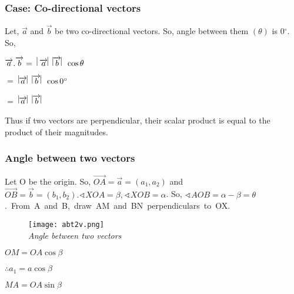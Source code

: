\documentclass[11pt]{article}
\begin{document}
\subsubsection{Case: Co-directional vectors}
Let, $\overrightarrow{a}$ and $\overrightarrow{b}$ be two co-directional vectors. So, angle between them $(\theta)$ is 0$^{\circ}$.\\
So, \begin{center} $\overrightarrow{a}.\overrightarrow{b} =\hspace{0.2cm} \vline \overrightarrow{a} \vline \hspace{0.2cm} \vline \overrightarrow{b} \vline \hspace{0.2cm} \cos \theta$


\hspace{0.9cm}
$=$ $\vline \overrightarrow{a} \vline \hspace{0.2cm} \vline \overrightarrow{b} \vline \hspace{0.2cm} \cos 0^{\circ}$


\hspace{-0.2cm}
$=$ $\vline \overrightarrow{a} \vline \hspace{0.2cm} \vline \overrightarrow{b} \vline$
\end{center}
Thus if two vectors are perpendicular, their scalar product is equal to the product of their magnitudes.
\newpage
\subsubsection{Angle between two vectors}
Let O be the origin. So, $\overrightarrow{OA}=\overrightarrow{a}=(a_1,a_2)$ and $\overrightarrow{OB}=\overrightarrow{b}=(b_1,b_2). \sphericalangle XOA=\beta, \sphericalangle XOB = \alpha$. So, \mbox{$\sphericalangle AOB=\alpha - \beta=\theta$. \hspace{0.1cm} 
From A and B, draw AM and BN perpendiculars to OX.}
\vspace{-0.5cm}
\begin{wrapfigure}{r}{0.40\textwidth} %
    \centering
    \texttt{[image: abt2v.png]}\\
    \textit{Angle between two vectors}
\end{wrapfigure}


$OM=OA\cos\beta$ 


\hspace{-0.4cm}$\therefore a_1=a \cos \beta$


$MA=OA\sin\beta$
\end{document}
